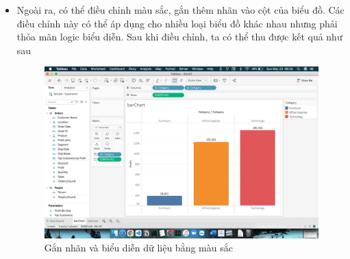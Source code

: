 \documentclass[a4paper, 12pt]{article}
\begin{document}
\begin{itemize}
\begin{itemize}
        \item Ngoài ra, có thể điều chỉnh màu sắc, gắn thêm nhãn vào cột của biểu đồ. Các điều chỉnh này có thể áp dụng cho nhiều loại biểu đồ khác nhau nhưng phải thỏa mãn logic biểu diễn. Sau khi điều chỉnh, ta có thể thu được kết quả như sau
        \begin{figure}[H]
            \begin{center}
                \includegraphics[scale=0.3]{img/barChart1.png}
                \caption{Gắn nhãn và biểu diễn dữ liệu bằng màu sắc}
            \end{center}
        \end{figure}
    \end{itemize}


\end{itemize}
\end{document}
